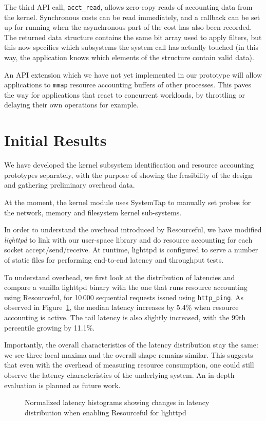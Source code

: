 \documentclass[letterpaper,twocolumn,10pt]{article}
\newcommand{\pname}{Resourceful}
\begin{document}
The third API call, \texttt{acct\_read}, allows zero-copy reads of accounting
data from the kernel. Synchronous costs can be read immediately, and a callback
can be set up for running when the asynchronous part of the cost has also been
recorded. The returned data structure contains the same bit array used to apply
filters, but this now specifies which subsystems the system call has actually touched
(in this way, the application knows which elements of the structure contain valid data).

An API extension which we have not yet implemented in our prototype will allow applications
to \texttt{mmap} resource accounting buffers of other processes. This paves the way for applications that
react to concurrent workloads, by throttling or delaying their own
operations for example.

\section{Initial Results}
We have developed the kernel subsystem identification and resource accounting
prototypes separately, with the purpose of showing the feasibility of the design
and gathering preliminary overhead data.

At the moment, the kernel module uses SystemTap to manually set probes for the
network, memory and filesystem kernel sub-systems.

In order to understand the overhead introduced by \pname, we have modified
\textit{lighttpd} to link with our user-space library and do resource accounting
for each socket accept/send/receive. At runtime, lighttpd is configured to serve
a number of static files for performing end-to-end latency and throughput tests.

To understand overhead, we first look at the distribution of latencies and
compare a vanilla lighttpd binary with the one that runs resource accounting
using \pname, for 10\,000 sequential requests issued using \texttt{http\_ping}. As
observed in Figure~\ref{fig:experiment1}, the median latency increases by 5.4\%
when resource accounting is active. The tail latency is also slightly increased,
with the 99th percentile growing by 11.1\%.

Importantly, the overall characteristics of the latency distribution stay the same:
we see three local maxima and the overall shape remains similar. This suggests that even with the overhead
of measuring resource consumption, one could still observe the latency characteristics of the underlying system.
An in-depth evaluation is planned as future work.
\begin{figure}[ht!] 
	\centering
	\hspace*{-0.05\columnwidth} 
	\def\svgwidth{\columnwidth}
	
	\caption{Normalized latency histograms showing changes in latency distribution when enabling \pname{ }for lighttpd} 
	\label{fig:experiment1}
\end{figure}
\end{document}
